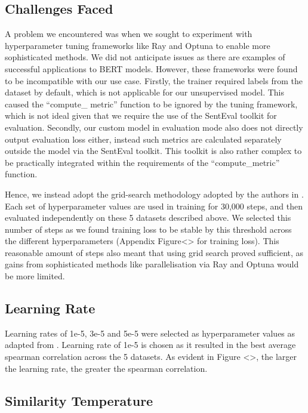 \documentclass[10pt,twocolumn,letterpaper]{article}
\begin{document}
\subsection{Challenges Faced}

A problem we encountered was when we sought to experiment with hyperparameter tuning frameworks like Ray and Optuna to enable more sophisticated methods. We did not anticipate issues as there are examples of successful applications to BERT models. However, these frameworks were found to be incompatible with our use case. Firstly, the trainer required labels from the dataset by default, which is not applicable for our unsupervised model. This caused the ``compute\_ metric'' function to be ignored by the tuning framework, which is not ideal given that we require the use of the SentEval toolkit for evaluation. Secondly, our custom model in evaluation mode also does not directly output evaluation loss either, instead such metrics are calculated separately outside the model via the SentEval toolkit. This toolkit is also rather complex to be practically integrated within the requirements of the ``compute\_metric'' function.

Hence, we instead adopt the grid-search methodology adopted by the authors in \cite{2104.08821}. Each set of hyperparameter values are used in training for 30,000 steps, and then evaluated independently on these 5 datasets described above. We selected this number of steps as we found training loss to be stable by this threshold across the different hyperparameters (Appendix Figure<> for training loss). This reasonable amount of steps also meant that using grid search proved sufficient, as gains from sophisticated methods like parallelisation via Ray and Optuna would be more limited.


\subsection{Learning Rate}

Learning rates of 1e-5, 3e-5 and 5e-5 were selected as hyperparameter values as adapted from \cite{2104.08821}. Learning rate of 1e-5 is chosen as it resulted in the best average spearman correlation across the 5 datasets. As evident in Figure <>, the larger the learning rate, the greater the spearman correlation.

\subsection{Similarity Temperature}
\end{document}
